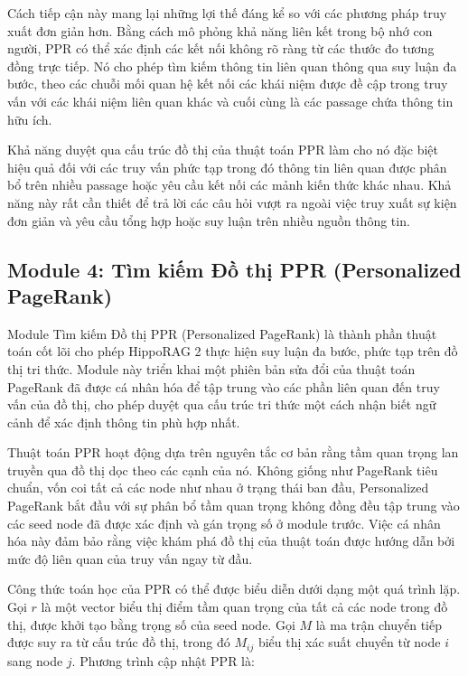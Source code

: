 \documentclass[../main.tex]{subfiles}
\begin{document}
Cách tiếp cận này mang lại những lợi thế đáng kể so với các phương pháp truy xuất đơn giản hơn. Bằng cách mô phỏng khả năng liên kết trong bộ nhớ con người, PPR có thể xác định các kết nối không rõ ràng từ các thước đo tương đồng trực tiếp. Nó cho phép tìm kiếm thông tin liên quan thông qua suy luận đa bước, theo các chuỗi mối quan hệ kết nối các khái niệm được đề cập trong truy vấn với các khái niệm liên quan khác và cuối cùng là các passage chứa thông tin hữu ích. 

Khả năng duyệt qua cấu trúc đồ thị của thuật toán PPR làm cho nó đặc biệt hiệu quả đối với các truy vấn phức tạp trong đó thông tin liên quan được phân bổ trên nhiều passage hoặc yêu cầu kết nối các mảnh kiến thức khác nhau. Khả năng này rất cần thiết để trả lời các câu hỏi vượt ra ngoài việc truy xuất sự kiện đơn giản và yêu cầu tổng hợp hoặc suy luận trên nhiều nguồn thông tin.



\subsection{Module 4: Tìm kiếm Đồ thị PPR (Personalized PageRank)}
Module Tìm kiếm Đồ thị PPR (Personalized PageRank) là thành phần thuật toán cốt lõi cho phép HippoRAG 2 thực hiện suy luận đa bước, phức tạp trên đồ thị tri thức. Module này triển khai một phiên bản sửa đổi của thuật toán PageRank đã được cá nhân hóa để tập trung vào các phần liên quan đến truy vấn của đồ thị, cho phép duyệt qua cấu trúc tri thức một cách nhận biết ngữ cảnh để xác định thông tin phù hợp nhất.

Thuật toán PPR hoạt động dựa trên nguyên tắc cơ bản rằng tầm quan trọng lan truyền qua đồ thị dọc theo các cạnh của nó. Không giống như PageRank tiêu chuẩn, vốn coi tất cả các node như nhau ở trạng thái ban đầu, Personalized PageRank bắt đầu với sự phân bổ tầm quan trọng không đồng đều tập trung vào các seed node đã được xác định và gán trọng số ở module trước. Việc cá nhân hóa này đảm bảo rằng việc khám phá đồ thị của thuật toán được hướng dẫn bởi mức độ liên quan của truy vấn ngay từ đầu.

Công thức toán học của PPR có thể được biểu diễn dưới dạng một quá trình lặp. Gọi $r$ là một vector biểu thị điểm tầm quan trọng của tất cả các node trong đồ thị, được khởi tạo bằng trọng số của seed node. Gọi $M$ là ma trận chuyển tiếp được suy ra từ cấu trúc đồ thị, trong đó $M_{ij}$ biểu thị xác suất chuyển từ node $i$ sang node $j$. Phương trình cập nhật PPR là:
\end{document}
